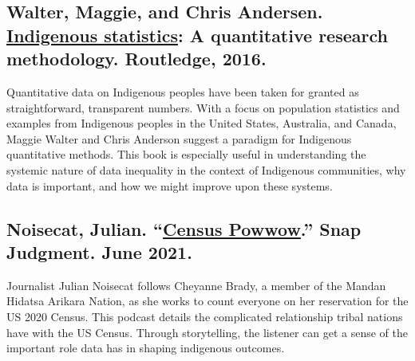 \documentclass[
]{book}
\begin{document}
\hypertarget{walter-maggie-and-chris-andersen.-indigenous-statistics-a-quantitative-research-methodology.-routledge-2016.}{%
\subsection*{\texorpdfstring{Walter, Maggie, and Chris Andersen. \href{https://www.taylorfrancis.com/books/mono/10.4324/9781315426570/indigenous-statistics-maggie-walter-chris-andersen}{Indigenous statistics}: A quantitative research methodology. Routledge, 2016.}{Walter, Maggie, and Chris Andersen. Indigenous statistics: A quantitative research methodology. Routledge, 2016.}}\label{walter-maggie-and-chris-andersen.-indigenous-statistics-a-quantitative-research-methodology.-routledge-2016.}}

Quantitative data on Indigenous peoples have been taken for granted as straightforward, transparent numbers. With a focus on population statistics and examples from Indigenous peoples in the United States, Australia, and Canada, Maggie Walter and Chris Anderson suggest a paradigm for Indigenous quantitative methods. This book is especially useful in understanding the systemic nature of data inequality in the context of Indigenous communities, why data is important, and how we might improve upon these systems.

\hypertarget{noisecat-julian.-census-powwow.-snap-judgment.-june-2021.}{%
\subsection*{\texorpdfstring{Noisecat, Julian. ``\href{https://open.spotify.com/episode/28040mhUkpvUtas8bd6rmE?si=e0j9BvQ5R9m3e0AGbZajSw}{Census Powwow}.'' Snap Judgment. June 2021.}{Noisecat, Julian. ``Census Powwow.'' Snap Judgment. June 2021.}}\label{noisecat-julian.-census-powwow.-snap-judgment.-june-2021.}}

Journalist Julian Noisecat follows Cheyanne Brady, a member of the Mandan Hidatsa Arikara Nation, as she works to count everyone on her reservation for the US 2020 Census. This podcast details the complicated relationship tribal nations have with the US Census. Through storytelling, the listener can get a sense of the important role data has in shaping indigenous outcomes.
\end{document}
